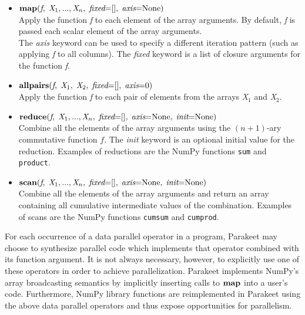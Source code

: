 \documentclass[10pt,twocolumn]{article}
\begin{document}
\begin{itemize}
\item $\mbox{\textbf{map}}(\textit{f}, \; \textit{X}_1,  ... ,  \textit{X}_n, \; \textit{fixed}\textrm{=[]}, \; \textit{axis}\textrm{=None})$ \\
  Apply the function \textit{f} to each element of the array arguments. By default, \textit{f} is passed each scalar element of the array arguments. \\
  The \textit{axis} keyword can be used to specify a different iteration pattern (such as applying \textit{f} to all columns). 
  The \textit{fixed} keyword is a list of closure arguments for the function \textit{f}.
       
\item $\mbox{\textbf{allpairs}}(\textit{f}, \; \textit{X}_1,  \; \textit{X}_2, \; \textit{fixed}\textrm{=[]}, \; \textit{axis}\textrm{=} 0)$ \\
  Apply the function \textit{f} to each pair of elements from the arrays \textit{X}$_1$ and \textit{X}$_2$.   
\item $\mbox{\textbf{reduce}}(\textit{f}, \; \textit{X}_1,  ... ,  \textit{X}_n, \; \textit{fixed}\textrm{=[]}, \; \textit{axis}\textrm{=None}, \; \textit{init}\textrm{=None})$ \\
  Combine all the elements of the array arguments using the $(n+1)$-ary commutative function $f$. The \textit{init} keyword is an optional initial value for the reduction. Examples of reductions are the NumPy functions \lstinline{sum} and \lstinline{product}. 
\item $\mbox{\textbf{scan}}(\textit{f}, \; \textit{X}_1,  ... ,  \textit{X}_n, \; \textit{fixed}\textrm{=[]}, \; \textit{axis}\textrm{=None}, \;  \textit{init}\textrm{=None})$ \\
  Combine all the elements of the array arguments and return an array containing all cumulative intermediate values of the combination. 
  Examples of scans are the NumPy functions \lstinline{cumsum} and \lstinline{cumprod}. 
\end{itemize}

For each occurrence of a data parallel operator in a program, Parakeet may choose to synthesize parallel code which implements that operator combined with its function argument.  It is not always necessary, however, to explicitly use one of these operators in order to achieve parallelization. Parakeet implements NumPy's array broadcasting semantics by implicitly inserting calls to $\mbox{\textbf{map}}$ into a user's code. 
Furthermore, NumPy library functions are reimplemented in Parakeet using the above data parallel operators and thus expose opportunities for parallelism.
\end{document}
